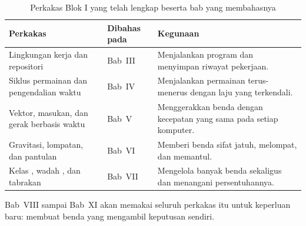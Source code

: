 \begin{table}[htbp]
\centering
\caption{Perkakas Blok I yang telah lengkap beserta bab yang membahasnya}
\label{tab:perkakas-blok-1}
{\setlength{\tabcolsep}{4pt}\footnotesize%
\begin{tabularx}{\textwidth}{@{}L{3.6cm} L{3.0cm} Y@{}}
\toprule
\headrow \textbf{Perkakas} & \textbf{Dibahas pada} & \textbf{Kegunaan} \\
\midrule
Lingkungan kerja dan repositori & Bab~III &
Menjalankan program dan menyimpan riwayat pekerjaan. \\
\addlinespace
Siklus permainan dan pengendalian waktu & Bab~IV &
Menjalankan permainan terus-menerus dengan laju yang terkendali. \\
\addlinespace
Vektor, masukan, dan gerak berbasis waktu & Bab~V &
Menggerakkan benda dengan kecepatan yang sama pada setiap komputer. \\
\addlinespace
Gravitasi, lompatan, dan pantulan & Bab~VI &
Memberi benda sifat jatuh, melompat, dan memantul. \\
\addlinespace
Kelas , wadah , dan tabrakan & Bab~VII &
Mengelola banyak benda sekaligus dan menangani persentuhannya. \\
\bottomrule
\end{tabularx}}
\end{table}

Bab~VIII sampai Bab~XI akan memakai seluruh perkakas itu untuk keperluan baru:
membuat benda yang mengambil keputusan sendiri.
